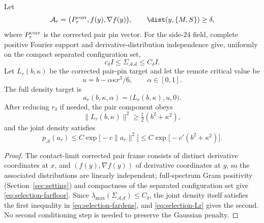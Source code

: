 \begin{lemma}\label{lem:selection-farblock}
Let
\begin{equation}\label{eq:selection-farblock}
\mathcal A_r=\bigl(P^{\rm corr}_r,f(y),\nabla f(y)\bigr),\qquad\dist(y,\{M,S\})\ge\delta,
\end{equation}
where $P^{\rm corr}_r$ is the corrected pair pin vector. For the side-$24$ field, complete positive Fourier support and derivative-distribution independence give, uniformly on the compact separated configuration set,
\begin{equation}\label{eq:selection-farfloor}
c_\delta I\le\Sigma_{\mathcal A\mathcal A}\le C_\delta I .
\end{equation}
Let $L_r(b,\kappa)$ be the corrected pair-pin target and let the remote critical value be
\begin{equation}\label{eq:selection-farwindow}
u=b-\alpha\kappa r^3/6,\qquad\alpha\in[0,1].
\end{equation}
The full density target is
\begin{equation}\label{eq:selection-fartarget}
a_r(b,\kappa,\alpha)=\bigl(L_r(b,\kappa),u,0\bigr).
\end{equation}
After reducing $r_\delta$ if needed, the pair component obeys
\begin{equation}\label{eq:selection-Lr}
\|L_r(b,\kappa)\|^2\ge\tfrac12(b^2+\kappa^2),
\end{equation}
and the joint density satisfies
\begin{equation}\label{eq:selection-fardens}
p_{\mathcal A}(a_r)\le C\exp\bigl[-c\|a_r\|^2\bigr]\le C\exp\bigl[-c'(b^2+\kappa^2)\bigr].
\end{equation}
\end{lemma}

\begin{proof}
The contact-limit corrected pair frame consists of distinct derivative coordinates at $x$, and $(f(y),\nabla f(y))$ of derivative coordinates at $y$, so the associated distributions are linearly independent; full-spectrum Gram positivity (Section~\ref{sec:setting}) and compactness of the separated configuration set give \eqref{eq:selection-farfloor}. Since $\lambda_{\max}(\Sigma_{\mathcal A\mathcal A})\le C_\delta$, the joint density itself satisfies the first inequality in \eqref{eq:selection-fardens}, and \eqref{eq:selection-Lr} gives the second. No second conditioning step is needed to preserve the Gaussian penalty.
\end{proof}

